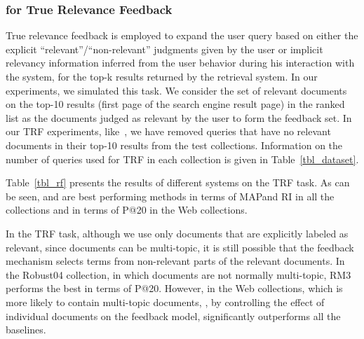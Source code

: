 \subsubsection{\acswlm for True Relevance Feedback}
\label{sec:RF}

True relevance feedback is employed to expand the user query based on either the explicit ``relevant''/``non-relevant'' judgments given by the user or implicit relevancy information inferred from the user behavior during his interaction with the system, for the top-k results returned by the retrieval system. 
In our experiments, we simulated this task. We consider the set of relevant documents on the top-10 results (first page of the search engine result page) in the ranked list as the documents judged as relevant by the user to form the feedback set. In our TRF experiments, like~\citet{Lv:2009:CIKM}, we have removed queries that have no relevant documents in their top-10 results from the test collections. Information on the number of queries used for TRF in each collection is given in Table~\ref{tbl_dataset}.

Table~\ref{tbl_rf} presents the results of different systems on the TRF task. As can be seen, \acswlm and \acrswlm are best performing methods in terms of MAP\@ and RI in all the collections and in terms of P@20 in the Web collections. 

In the TRF task, although we use only documents that are explicitly labeled as relevant, since documents can be multi-topic, it is still possible that the feedback mechanism selects terms from non-relevant parts of the relevant documents. In the Robust04 collection, in which documents are not normally multi-topic, RM3 performs the best in terms of P@20. However, in the Web collections, which is more likely to contain multi-topic documents, \acswlm, by controlling the effect of individual documents on the feedback model, significantly outperforms all the baselines.

